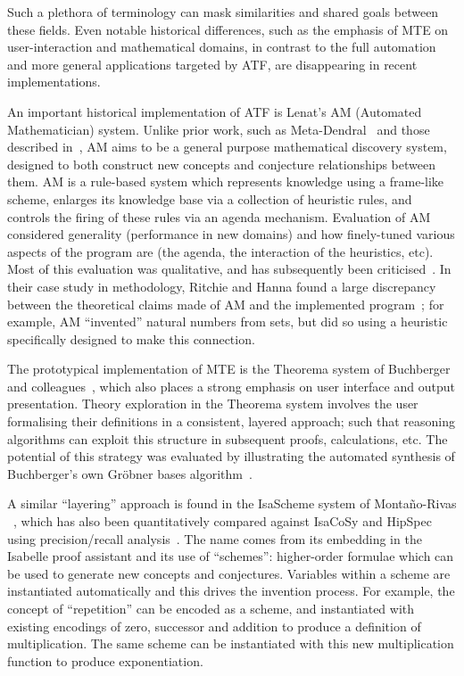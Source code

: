 Such a plethora of terminology can mask similarities and shared goals between
these fields. Even notable historical differences, such as the emphasis of MTE
on user-interaction and mathematical domains, in contrast to the full automation
and more general applications targeted by ATF, are disappearing in recent
implementations.

An important historical implementation of ATF is Lenat's AM (Automated
Mathematician) system. Unlike prior work, such as
Meta-Dendral~\cite{buchanan:75} and those described in~\cite{winston}, AM aims
to be a general purpose mathematical discovery system, designed to both
construct new concepts and conjecture relationships between them. AM is a
rule-based system which represents knowledge using a frame-like scheme, enlarges
its knowledge base via a collection of heuristic rules, and controls the firing
of these rules via an agenda mechanism. Evaluation of AM considered generality
(performance in new domains) and how finely-tuned various aspects of the program
are (the agenda, the interaction of the heuristics, etc). Most of this
evaluation was qualitative, and has subsequently been
criticised~\cite[chap.~13]{colton:book}. In their case study in methodology,
Ritchie and Hanna found a large discrepancy between the theoretical claims made
of AM and the implemented program~\cite{partridge}; for example, AM ``invented''
natural numbers from sets, but did so using a heuristic specifically designed to
make this connection.

The prototypical implementation of MTE is the Theorema system of Buchberger and
colleagues~\cite{buchberger,buchberger2016theorema}, which also places a strong
emphasis on user interface and output presentation. Theory exploration in the
Theorema system involves the user formalising their definitions in a consistent,
layered approach; such that reasoning algorithms can exploit this structure in
subsequent proofs, calculations, etc. The potential of this strategy was
evaluated by illustrating the automated synthesis of Buchberger's own Gr\"obner
bases algorithm~\cite{buchberger:04}.

A similar ``layering'' approach is found in the IsaScheme system of
Monta{\~n}o-Rivas \etal{}~\cite{MontanoRivas2011}, which has also been
quantitatively compared against IsaCoSy and HipSpec using precision/recall
analysis~\cite{claessen2013automating}. The name comes from its embedding in the
Isabelle proof assistant and its use of ``schemes'': higher-order formulae which
can be used to generate new concepts and conjectures. Variables within a scheme
are instantiated automatically and this drives the invention process. For
example, the concept of ``repetition'' can be encoded as a scheme, and
instantiated with existing encodings of zero, successor and addition to produce
a definition of multiplication. The same scheme can be instantiated with this
new multiplication function to produce exponentiation.

